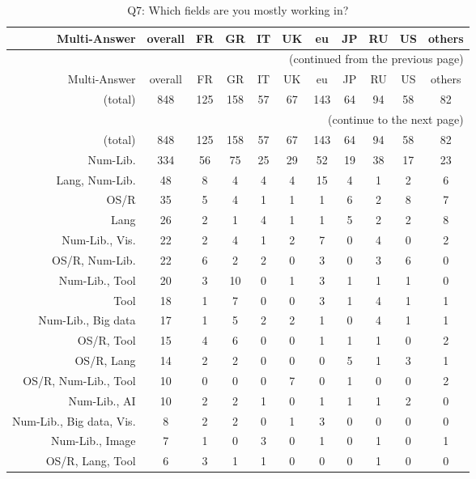 \clearpage%
{\footnotesize\begin{landscape}%
\begin{longtable}[htb]{r|c|c|c|c|c|c|c|c|c|c}%
\caption{Q7: Which fields are you mostly working in?}%
\label{tab:Q7-mans} \\%
\hline%
Multi-Answer & overall & FR & GR & IT & UK & eu & JP & RU & US & others \\
 \hline%
\endfirsthead%
\multicolumn{11}{r}{(continued from the previous page)}\\%
\hline%
Multi-Answer & overall & FR & GR & IT & UK & eu & JP & RU & US & others \\
 \hline%
\endhead%
\hline%
(total) & 848 & 125 & 158 & 57 & 67 & 143 & 64 & 94 & 58 & 82 \\%
\hline%
\multicolumn{11}{r}{(continue to the next page)}\\%
\endfoot%
\hline%
(total) & 848 & 125 & 158 & 57 & 67 & 143 & 64 & 94 & 58 & 82 \\%
\hline%
\endlastfoot%
\hline%
{Num-Lib.} & 334 & 56 & 75 & 25 & 29 & 52 & 19 & 38 & 17 & 23 \\%
{Lang, Num-Lib.} & 48 & 8 & 4 & 4 & 4 & 15 & 4 & 1 & 2 & 6 \\%
{OS/R} & 35 & 5 & 4 & 1 & 1 & 1 & 6 & 2 & 8 & 7 \\%
{Lang} & 26 & 2 & 1 & 4 & 1 & 1 & 5 & 2 & 2 & 8 \\%
{Num-Lib., Vis.} & 22 & 2 & 4 & 1 & 2 & 7 & 0 & 4 & 0 & 2 \\%
{OS/R, Num-Lib.} & 22 & 6 & 2 & 2 & 0 & 3 & 0 & 3 & 6 & 0 \\%
{Num-Lib., Tool} & 20 & 3 & 10 & 0 & 1 & 3 & 1 & 1 & 1 & 0 \\%
{Tool} & 18 & 1 & 7 & 0 & 0 & 3 & 1 & 4 & 1 & 1 \\%
{Num-Lib., Big data} & 17 & 1 & 5 & 2 & 2 & 1 & 0 & 4 & 1 & 1 \\%
{OS/R, Tool} & 15 & 4 & 6 & 0 & 0 & 1 & 1 & 1 & 0 & 2 \\%
{OS/R, Lang} & 14 & 2 & 2 & 0 & 0 & 0 & 5 & 1 & 3 & 1 \\%
{OS/R, Num-Lib., Tool} & 10 & 0 & 0 & 0 & 7 & 0 & 1 & 0 & 0 & 2 \\%
{Num-Lib., AI} & 10 & 2 & 2 & 1 & 0 & 1 & 1 & 1 & 2 & 0 \\%
{Num-Lib., Big data, Vis.} & 8 & 2 & 2 & 0 & 1 & 3 & 0 & 0 & 0 & 0 \\%
{Num-Lib., Image} & 7 & 1 & 0 & 3 & 0 & 1 & 0 & 1 & 0 & 1 \\%
{OS/R, Lang, Tool} & 6 & 3 & 1 & 1 & 0 & 0 & 0 & 1 & 0 & 0 \\%

\end{longtable}
\end{landscape}}
